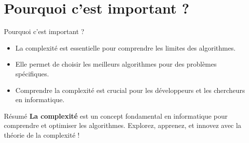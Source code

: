 \documentclass{clbeamer2024}
\begin{document}
\section{Pourquoi c'est important ?}
\begin{frame}{Pourquoi c'est important ?}
	\begin{itemize}
		\item La complexité est essentielle pour comprendre les limites des algorithmes.
		\item Elle permet de choisir les meilleurs algorithmes pour des problèmes spécifiques.
		\item Comprendre la complexité est crucial pour les développeurs et les chercheurs en informatique.
	\end{itemize}
\end{frame}

\begin{frame}{Résumé}
	\textbf{La complexité} est un concept fondamental en informatique pour comprendre et optimiser les algorithmes.  
	Explorez, apprenez, et innovez avec la théorie de la complexité !
\end{frame}


	
\end{document}
